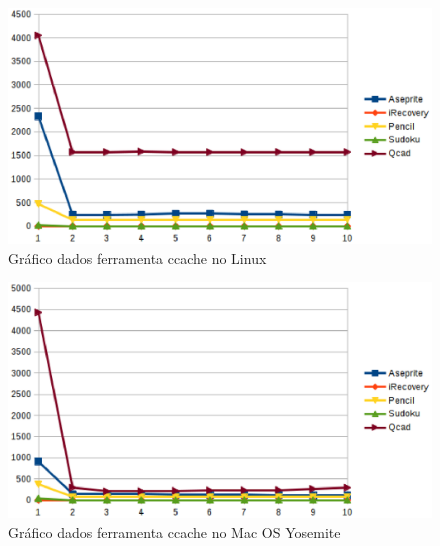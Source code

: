         \begin{figure}[!h]
            \centering
                \includegraphics{figuras/graficos/linux_ccache.eps}
            \caption{Gráfico dados ferramenta ccache no Linux}
            \label{grafico_ccache_linux}
        \end{figure}

        \begin{figure}[!h]
            \centering
                \includegraphics{figuras/graficos/mac_os_ccache.eps}
            \caption{Gráfico dados ferramenta ccache no Mac OS Yosemite}
            \label{grafico_ccache_mac_os}
        \end{figure}

